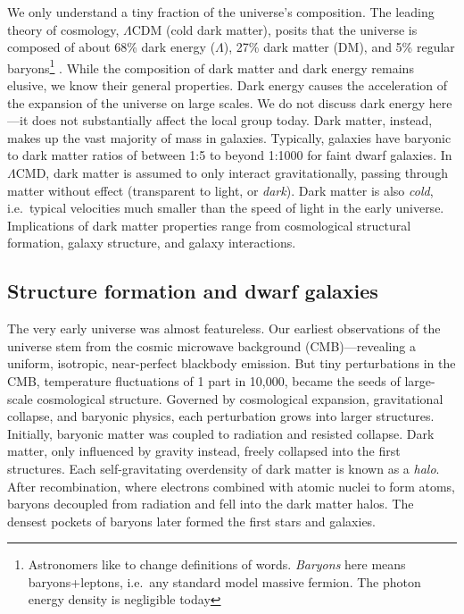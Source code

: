 We only understand a tiny fraction of the universe's composition. The
leading theory of cosmology, \(\Lambda\)CDM (cold dark matter), posits
that the universe is composed of about 68\% dark energy (\(\Lambda\)),
27\% dark matter (DM), and 5\% regular baryons\footnote{Astronomers like
  to change definitions of words. \emph{Baryons} here means
  baryons+leptons, i.e.~any standard model massive fermion. The photon
  energy density is negligible today} \citep{planckcollaboration+2020}.
While the composition of dark matter and dark energy remains elusive, we
know their general properties. Dark energy causes the acceleration of
the expansion of the universe on large scales. We do not discuss dark
energy here---it does not substantially affect the local group today.
Dark matter, instead, makes up the vast majority of mass in galaxies.
Typically, galaxies have baryonic to dark matter ratios of between 1:5
to beyond 1:1000 for faint dwarf galaxies. In \(\Lambda\)CMD, dark
matter is assumed to only interact gravitationally, passing through
matter without effect (transparent to light, or \emph{dark}). Dark
matter is also \emph{cold}, i.e.~typical velocities much smaller than
the speed of light in the early universe. Implications of dark matter
properties range from cosmological structural formation, galaxy
structure, and galaxy interactions.

\subsection{Structure formation and dwarf
galaxies}\label{structure-formation-and-dwarf-galaxies}

The very early universe was almost featureless. Our earliest
observations of the universe stem from the cosmic microwave background
(CMB)---revealing a uniform, isotropic, near-perfect blackbody emission.
But tiny perturbations in the CMB, temperature fluctuations of 1 part in
10,000, became the seeds of large-scale cosmological structure. Governed
by cosmological expansion, gravitational collapse, and baryonic physics,
each perturbation grows into larger structures. Initially, baryonic
matter was coupled to radiation and resisted collapse. Dark matter, only
influenced by gravity instead, freely collapsed into the first
structures. Each self-gravitating overdensity of dark matter is known as
a \emph{halo}. After recombination, where electrons combined with atomic
nuclei to form atoms, baryons decoupled from radiation and fell into the
dark matter halos. The densest pockets of baryons later formed the first
stars and galaxies.

